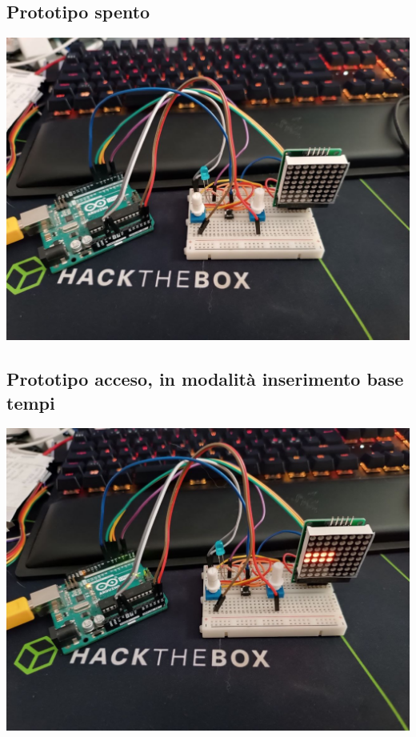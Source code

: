 \documentclass{article}
\begin{document}
\subsection{Prototipo spento}
\includegraphics[scale=.25]{protOff.jpg}
\subsection{Prototipo acceso, in modalità inserimento base tempi}
\includegraphics[scale=.25]{protOnIdle.jpg}
\end{document}
